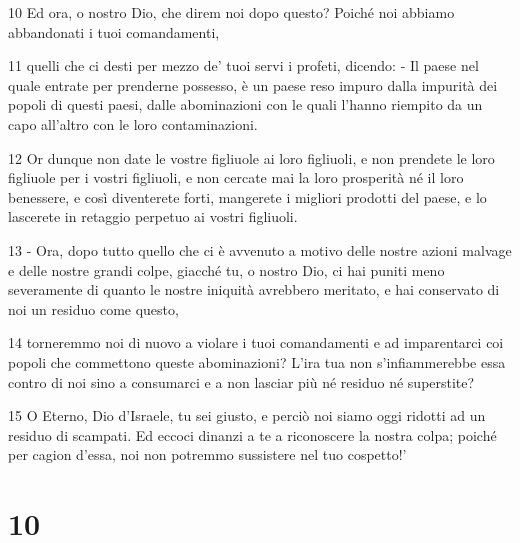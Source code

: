 \par 10 Ed ora, o nostro Dio, che direm noi dopo questo? Poiché noi abbiamo abbandonati i tuoi comandamenti,
\par 11 quelli che ci desti per mezzo de' tuoi servi i profeti, dicendo: - Il paese nel quale entrate per prenderne possesso, è un paese reso impuro dalla impurità dei popoli di questi paesi, dalle abominazioni con le quali l'hanno riempito da un capo all'altro con le loro contaminazioni.
\par 12 Or dunque non date le vostre figliuole ai loro figliuoli, e non prendete le loro figliuole per i vostri figliuoli, e non cercate mai la loro prosperità né il loro benessere, e così diventerete forti, mangerete i migliori prodotti del paese, e lo lascerete in retaggio perpetuo ai vostri figliuoli.
\par 13 - Ora, dopo tutto quello che ci è avvenuto a motivo delle nostre azioni malvage e delle nostre grandi colpe, giacché tu, o nostro Dio, ci hai puniti meno severamente di quanto le nostre iniquità avrebbero meritato, e hai conservato di noi un residuo come questo,
\par 14 torneremmo noi di nuovo a violare i tuoi comandamenti e ad imparentarci coi popoli che commettono queste abominazioni? L'ira tua non s'infiammerebbe essa contro di noi sino a consumarci e a non lasciar più né residuo né superstite?
\par 15 O Eterno, Dio d'Israele, tu sei giusto, e perciò noi siamo oggi ridotti ad un residuo di scampati. Ed eccoci dinanzi a te a riconoscere la nostra colpa; poiché per cagion d'essa, noi non potremmo sussistere nel tuo cospetto!'

\chapter{10}

